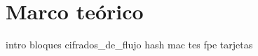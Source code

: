 %
%

\chapter{Marco teórico}
\label{sec:marco_teorico}

{intro}
{bloques}
{cifrados_de_flujo}
{hash}
{mac}
{tes}
{fpe}
{tarjetas}
